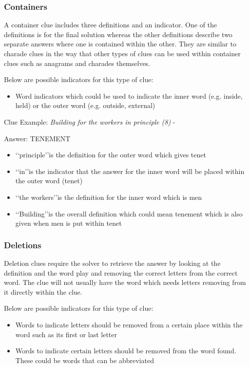 \subsubsection{Containers}

A container clue includes three definitions and an indicator. One of the definitions is for the final solution whereas the other definitions describe two separate answers where one is contained within the other. They are similar to charade clues in the way that other types of clues can be used within container clues such as anagrams and charades themselves.  

Below are possible indicators for this type of clue:
\begin{itemize} 
	\item Word indicators which could be used to indicate the inner word (e.g. inside, held) or the outer word (e.g. outside, external)
\\
\end{itemize}

Clue Example: \emph{Building for the workers in principle (8)}  - \citep{shuchiContainers09}

Answer: TENEMENT 

\begin{itemize}
	\item \lq\lq principle\rq\rq is the definition for the outer word which gives tenet 
	\item \lq\lq in\rq\rq is the indicator that the answer for the inner word will be placed within the outer word (tenet) 
	\item \lq\lq the workers\rq\rq is the definition for the inner word which is men 
	\item \lq\lq Building\rq\rq is the overall definition which could mean tenement which is also given when men is put within tenet 
\end{itemize}

\subsubsection{Deletions}

Deletion clues require the solver to retrieve the answer by looking at the definition and the word play and removing the correct letters from the correct word. The clue will not usually have the word which needs letters removing from it directly within the clue.  

Below are possible indicators for this type of clue:
\begin{itemize}
 	\item Words to indicate letters should be removed from a certain place within the word such as its first or last letter 
	\item Words to indicate certain letters should be removed from the word found. These could be words that can be abbreviated 
\\
\end{itemize}

